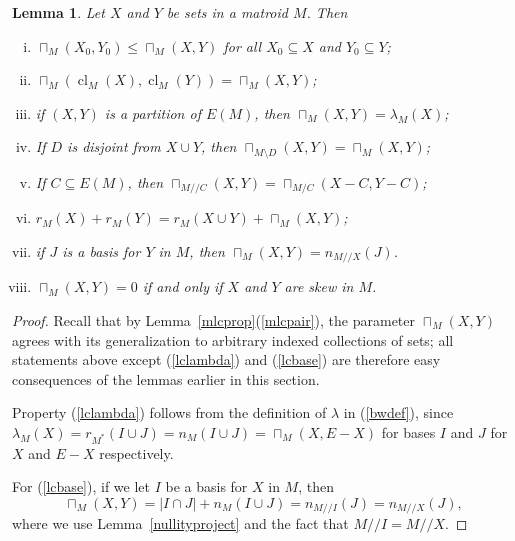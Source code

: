 \documentclass{amsart}
\theoremstyle{plain}
\newtheorem{lemma}[theorem]{Lemma}
\theoremstyle{definition}
\newcommand{\dcon}{/ \!\! /}
\DeclareMathOperator{\cl}{cl}
\newcommand{\del}{\!\setminus\!}
\newcommand{\con}{/}
\renewcommand{\le}{\leqslant}
\renewcommand{\ss}{\subseteq}
\begin{document}
\begin{lemma}\label{lcprop}
  Let $X$ and $Y$ be sets in a matroid $M$. Then
  \begin{enumerate}[(i)]
    \item\label{lcmono} $\sqcap_M(X_0,Y_0) \le \sqcap_M(X,Y)$ for all $X_0 \ss X$ and $Y_0 \ss Y$;
    \item\label{lccl} $\sqcap_M(\cl_M(X),\cl_M(Y)) = \sqcap_M(X,Y)$;
    \item\label{lclambda} if $(X,Y)$ is a partition of $E(M)$, then $\sqcap_M(X,Y) = \lambda_M(X)$;
    \item\label{lcdelete} If $D$ is disjoint from $X \cup Y$, then $\sqcap_{M \del D}(X,Y) = \sqcap_M(X,Y)$;
    \item\label{lcproject} If $C \ss E(M)$, then $\sqcap_{M \dcon C}(X,Y) = \sqcap_{M \con C}(X-C,Y-C)$;
    \item\label{lcrank} $r_M(X) + r_M(Y) = r_M(X \cup Y) + \sqcap_M(X,Y)$;
    \item\label{lcbase} if $J$ is a basis for $Y$ in $M$, then $\sqcap_M(X,Y) = n_{M \dcon X}(J)$. 
    \item\label{lcskew} $\sqcap_M(X,Y) = 0$ if and only if $X$ and $Y$ are skew in $M$. 
  \end{enumerate}
\end{lemma}
\begin{proof}
  Recall that by Lemma~\ref{mlcprop}(\ref{mlcpair}), the parameter $\sqcap_M(X,Y)$ 
  agrees with its generalization to arbitrary indexed collections of sets;
  all statements above except (\ref{lclambda}) and (\ref{lcbase}) are
  therefore easy consequences of the lemmas earlier in this section. 

  Property (\ref{lclambda}) follows from the definition of $\lambda$ in (\ref{bwdef}), 
  since $\lambda_M(X) = r_{M^*}(I \cup J) = n_M(I \cup J) = \sqcap_M(X, E-X)$
  for bases $I$ and $J$ for $X$ and $E-X$ respectively. 

  For (\ref{lcbase}), if we let $I$ be a basis for $X$ in $M$, then 
  \[\sqcap_M(X,Y)  = |I \cap J| + n_M(I \cup J) = n_{M \dcon I}(J) = n_{M \dcon X}(J), \]
  where we use Lemma~\ref{nullityproject} and the fact that $M \dcon I = M \dcon X$. 
\end{proof}
\end{document}
